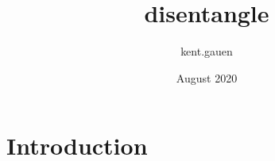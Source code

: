 \documentclass{article}
\title{disentangle}
\author{kent.gauen }
\date{August 2020}
\begin{document}
\maketitle

\section{Introduction}
\end{document}
